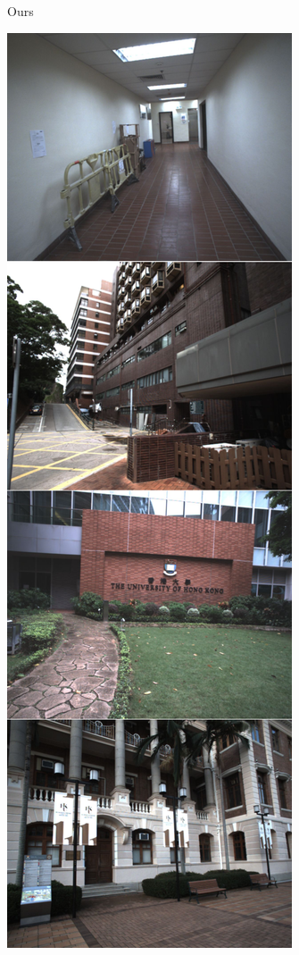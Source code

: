 \documentclass[lettersize,journal]{IEEEtran}
\begin{document}
\begin{figure}[ht]
\begin{subfigure}{0.23\textwidth}
        \caption{Ours}
        \label{fig:qualitativecomparisonours}
    \end{subfigure}
    \hspace{0.005\textwidth} %
    \begin{subfigure}{0.23\textwidth} %
        \centering
        \includegraphics[width=\linewidth]{image/qualitative/groundtruth.pdf}

\end{subfigure}
\end{figure}
\end{document}
